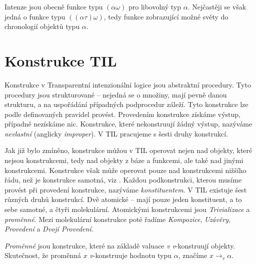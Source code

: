 Intenze jsou obecně funkce typu $(\alpha\omega)$ pro libovolný typ $\alpha$. Nejčastěji se však
jedná o funkce typu $((\alpha\tau)\omega)$, tedy funkce zobrazující možné světy do chronologií
objektů typu $\alpha$.

\section{Konstrukce TIL}

Konstrukce v Transparentní intenzionální logice jsou abstraktní procedury. Tyto procedury jsou
strukturované -- nejedná se o množiny, mají pevně danou strukturu, a na uspořádání případných
podprocedur záleží. Tyto konstrukce lze podle definovaných pravidel provést. Provedením konstrukce
získáme výstup, případně nezískáme nic. Konstrukce, které nekonstruují žádný výstup, nazýváme
\textit{nevlastní} (anglicky \textit{improper}). V TIL pracujeme s šesti druhy konstrukcí.
\cite{til-duzi}

Jak již bylo zmíněno, konstrukce můžou v TIL operovat nejen nad objekty, které nejsou konstrukcemi,
tedy nad objekty z báze a funkcemi, ale také nad jinými konstrukcemi. Konstrukce však může operovat
pouze nad konstrukcemi nižšího řádu, než je konstrukce samotná, viz . Každou
podkonstrukci, kterou musíme provést při provedení konstrukce, nazýváme \textit{konstituentem}.
V TIL existuje šest různých druhů konstrukcí. Dvě atomické -- mají pouze jeden konstituent, a to
sebe samotné, a čtyři molekulární. Atomickými konstrukcemi jsou \textit{Trivializace} a
\textit{proměnné}. Mezi molekulární konstrukce poté řadíme \textit{Kompozice}, \textit{Uzávěry},
\textit{Provedení} a \textit{Dvojí Provedení}.

\textit{Proměnné} jsou konstrukce, které na základě valuace \textit{v} \textit{v}-konstruují
objekty. Skutečnost, že proměnná $x$ \textit{v}-konstruuje hodnotu typu $\alpha$, značíme
$x \rightarrow_v \alpha$.

